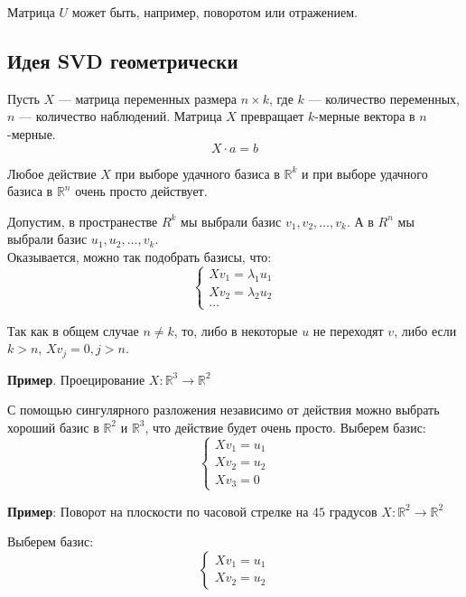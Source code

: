 \documentclass[12pt]{article} %
\theoremstyle{definition} %
\begin{document}
Матрица $U$ может быть, например, поворотом или отражением.

\subsection{Идея SVD геометрически}
Пусть $X$ — матрица переменных размера $n \times k$, где $k$ — количество переменных, $n$ — количество наблюдений.
Матрица $X$ превращает $k$-мерные вектора в $n$-мерные.\\
\[X \cdot a = b\]

Любое действие $X$ при выборе удачного базиса в $\mathbb{R}^k$ и при выборе удачного базиса в $\mathbb{R}^n$ очень просто действует.

Допустим, в пространестве $R^k$ мы выбрали базис $v_1, v_2, \ldots, v_k$. А в $R^n$ мы выбрали базис $u_1, u_2, \ldots, v_k$.\\
Оказывается, можно так подобрать базисы, что:
\begin{equation*}
 \begin{cases}
   Xv_1=\lambda_1u_1
   \\
 Xv_2=\lambda_2u_2
 \\
 \ldots
 \end{cases}
\end{equation*}

Так как в общем случае $n \neq k$, то, либо в некоторые $u$ не переходят $v$, либо
если $k>n$, $Xv_j=0, j>n$.

\textbf{Пример}. Проецирование $X:\mathbb{R}^3 \rightarrow  \mathbb{R}^2$

С помощью сингулярного разложения независимо от действия можно выбрать хороший базис в $\mathbb{R} ^2$ и $\mathbb{R} ^3$, что действие будет очень просто. Выберем базис:
\begin{equation*}
 \begin{cases}
   Xv_1=u_1
   \\
 Xv_2=u_2
 \\
 Xv_3=0
 \end{cases}
\end{equation*}

\textbf{Пример}: Поворот на плоскости по часовой стрелке на $45$ градусов $X:\mathbb{R} ^2 \rightarrow  \mathbb{R} ^2$

Выберем базис:
\begin{equation*}
 \begin{cases}
   Xv_1=u_1
   \\
Xv_2=u_2
 \end{cases}
\end{equation*}
\end{document}
